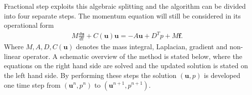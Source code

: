 Fractional step exploits this algebraic splitting and the algorithm can be divided into
four separate steps. The momentum equation will still be considered in its operational form 
\begin{align}
    M\frac{d \mathbf{u}}{dt} + C(\mathbf{u})\mathbf{u} = -A\mathbf{u} +D^T p +M\mathbf{f}.
    \label{eq:NSfracstep}
\end{align}
%
Where $M,A,D,C(\mathbf{u})$ denotes the mass integral, Laplacian, gradient and non-linear operator. 
A schematic overview of the method is stated below, where the equations on the right hand side are 
solved and the updated solution is stated on the left hand side. By performing these 
steps the solution $(\mathbf{u},p)$ is developed one time step
from $(\mathbf{u}^n,p^n)$ to $(\mathbf{u}^{n+1},p^{n+1})$. 
